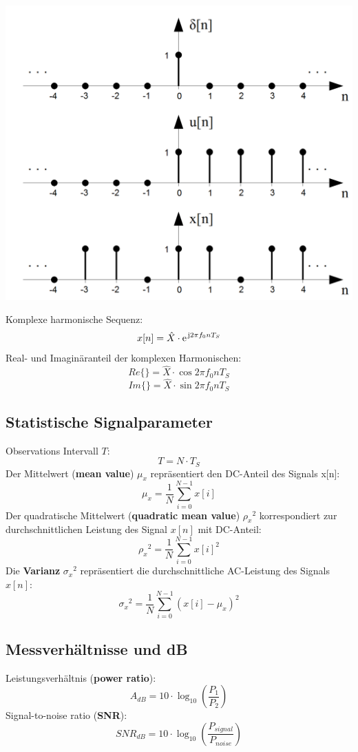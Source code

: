 \begin{center}
\includegraphics[scale=.7]{../fig/basic_signals}
\end{center}

Komplexe harmonische Sequenz:
\[ x[n] = \hat{X} \cdot \e^{\im 2 \pi f_0 n T_S} \]
Real- und Imaginäranteil der komplexen Harmonischen:
\[ Re\{\} = \hat{X} \cdot \cos 2 \pi f_0 n T_S \]
\[ Im\{\} = \hat{X} \cdot \sin 2 \pi f_0 n T_S \]

\subsection{Statistische Signalparameter}
Observations Intervall $T$:
\[ T = N \cdot T_S \]
Der Mittelwert (\textbf{mean value}) $\mu_x$ repräsentiert
den DC-Anteil des Signals x[n]:
\[ \mu_x = \frac{1}{N} \sum_{i=0}^{N-1}x[i] \]
Der quadratische Mittelwert (\textbf{quadratic mean value}) ${\rho_x}^2$
korrespondiert zur durchschnittlichen Leistung des Signal $x[n]$
mit DC-Anteil:
\[ {\rho_x}^2 = \frac{1}{N} \sum_{i=0}^{N-1} x[i]^2 \]
Die \textbf{Varianz} ${\sigma_x}^2$ repräsentiert die durchschnittliche
AC-Leistung des Signals $x[n]$:
\[ {\sigma_x}^2 = \frac{1}{N} \sum_{i=0}^{N-1}(x[i] - \mu_x)^2 \]

\subsection{Messverhältnisse und dB}
Leistungsverhältnis (\textbf{power ratio}):
\[ A_{dB} = 10 \cdot \log_{10} \left( \frac{P_1}{P_2} \right) \]
Signal-to-noise ratio (\textbf{SNR}):
\[ SNR_{dB} = 10 \cdot \log_{10} \left( \frac{P_{signal}}{P_{noise}} \right) \]

